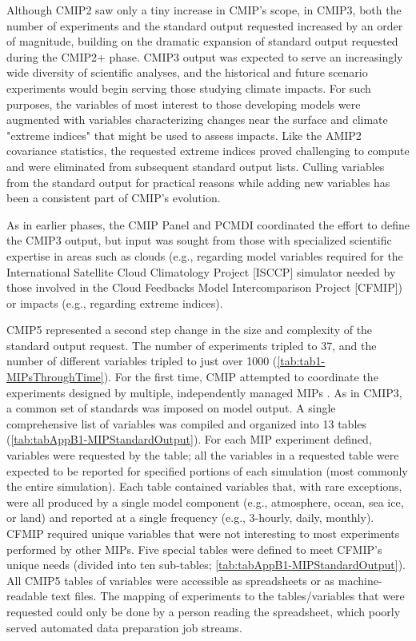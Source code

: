\documentclass[gmd, preprint]{copernicus}
\begin{document}
Although CMIP2 saw only a tiny increase in CMIP's scope, in CMIP3, both the number of experiments and the standard output requested increased by an order of magnitude, building on the dramatic expansion of standard output requested during the CMIP2+ phase. CMIP3 output was expected to serve an increasingly wide diversity of scientific analyses, and the historical and future scenario experiments would begin serving those studying climate impacts. For such purposes, the variables of most interest to those developing models were augmented with variables characterizing changes near the surface and climate "extreme indices" that might be used to assess impacts. Like the AMIP2 covariance statistics, the requested extreme indices proved challenging to compute and were eliminated from subsequent standard output lists. Culling variables from the standard output for practical reasons while adding new variables has been a consistent part of CMIP's evolution.

As in earlier phases, the CMIP Panel and PCMDI coordinated the effort to define the CMIP3 output, but input was sought from those with specialized scientific expertise in areas such as clouds (e.g., regarding model variables required for the International Satellite Cloud Climatology Project [ISCCP] simulator needed by those involved in the Cloud Feedbacks Model Intercomparison Project [CFMIP]) or impacts (e.g., regarding extreme indices).

CMIP5 represented a second step change in the size and complexity of the standard output request. The number of experiments tripled to 37, and the number of different variables tripled to just over 1000 (\autoref{tab:tab1-MIPsThroughTime}). For the first time, CMIP attempted to coordinate the experiments designed by multiple, independently managed MIPs \citep[even though in the overview paper, all experiments were identified by the phase only,][]{taylor_overview_2012}. As in CMIP3, a common set of standards was imposed on model output. A single comprehensive list of variables was compiled and organized into 13 tables (\autoref{tab:tabAppB1-MIPStandardOutput}). For each MIP experiment defined, variables were requested by the table; all the variables in a requested table were expected to be reported for specified portions of each simulation (most commonly the entire simulation). Each table contained variables that, with rare exceptions, were all produced by a single model component (e.g., atmosphere, ocean, sea ice, or land) and reported at a single frequency (e.g., 3-hourly, daily, monthly). CFMIP required unique variables that were not interesting to most experiments performed by other MIPs. Five special tables were defined to meet CFMIP's unique needs (divided into ten sub-tables; \autoref{tab:tabAppB1-MIPStandardOutput}). All CMIP5 tables of variables were accessible as spreadsheets or as machine-readable text files. The mapping of experiments to the tables/variables that were requested could only be done by a person reading the spreadsheet, which poorly served automated data preparation job streams.
\end{document}
